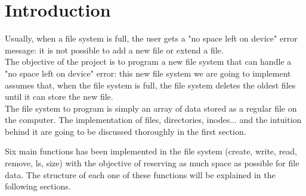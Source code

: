 \chapter{Introduction}
\label{cp:introduction}
Usually, when a file system is full, the user gets a "no space left on device" error message: it is not possible to add a new file or extend a file.\\

The objective of the project is to program a new file system that can handle a "no space left on device" error: this new file system we are going to implement assumes that, when the file system is full, the file system deletes the oldest files until it can store the new file.\\

The file system to program is simply an array of data stored as a regular file on the computer. The implementation of files, directories, inodes... and the intuition behind it are going to be discussed thoroughly in the first section.

Six main functions has been implemented in the file system (create, write, read, remove, ls, size) with the objective of reserving as much space as possible for file data. The structure of each one of these functions will be explained in the following sections.
\newpage